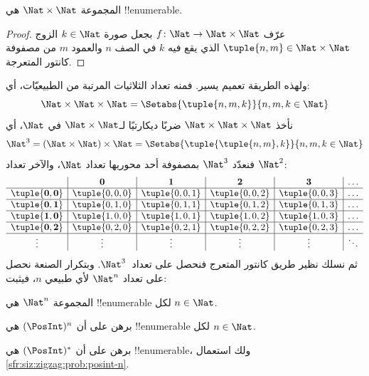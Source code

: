 \documentclass[../../../include/open-logic-section]{subfiles}
\begin{document}
\begin{prop}
المجموعة $\Nat \times \Nat$ هي !!{enumerable}.
\end{prop}

\begin{proof}
عرّف $f \colon \Nat \to \Nat\times\Nat$ بجعل صورة $k \in \Nat$
الزوج $\tuple{n,m} \in \Nat \times \Nat$ الذي يقع فيه $k$
في الصف $n$ والعمود $m$ من مصفوفة كانتور المتعرجة.
\end{proof}

\begin{explain}
ولهذه الطريقة تعميم يسير. فمنه تعداد الثلاثيات المرتبة من
الطبيعيّات، أي:
\[
\Nat \times \Nat \times \Nat = \Setabs{\tuple{n,m,k}}{n,m,k \in \Nat}
\]
نأخذ $\Nat \times \Nat \times \Nat$ ضربًا ديكارتيًا
لـ$\Nat \times \Nat$ في $\Nat$، أي
\[
\Nat^3 = (\Nat \times \Nat) \times \Nat =
\Setabs{\tuple{\tuple{n,m},k}}{n, m, k
  \in \Nat }
\]
فنعدّد $\Nat^3$ بمصفوفة أحد محوريها تعداد $\Nat$،
والآخر تعداد $\Nat^2$:
\[
\begin{array}{ c | c | c | c | c | c}
& \mathbf 0 & \mathbf 1 & \mathbf 2 & \mathbf 3 & \dots \\
\hline
\mathbf{\tuple{0,0}} & \tuple{0,0,0} & \tuple{0,0,1} & \tuple{0,0,2} & \tuple{0,0,3} & \dots \\
\hline
\mathbf{\tuple{0,1}} & \tuple{0,1,0} & \tuple{0,1,1} & \tuple{0,1,2} & \tuple{0,1,3} & \dots \\
\hline
\mathbf{\tuple{1,0}} & \tuple{1,0,0} & \tuple{1,0,1} & \tuple{1,0,2} & \tuple{1,0,3} & \dots \\
\hline
\mathbf{\tuple{0,2}} & \tuple{0,2,0} & \tuple{0,2,1} & \tuple{0,2,2} & \tuple{0,2,3} & \dots\\
\hline
\vdots & \vdots & \vdots & \vdots & \vdots & \ddots \\
\end{array}
\]
ثم نسلك نظير طريق كانتور المتعرج فنحصل على تعداد~$\Nat^3$.
وبتكرار الصنعة نحصل على تعداد $\Nat^n$ لأي طبيعي $n$، فيثبت:
\end{explain}

\begin{prop}
المجموعة $\Nat^n$ هي !!{enumerable} لكل $n \in \Nat$.
\end{prop}

\begin{prob}\label{sfr:siz:zigzag:prob:posint-n}
برهن على أن $(\PosInt)^n$ هي !!{enumerable} لكل $n \in \Nat$.
\end{prob}

\begin{prob}\label{sfr:siz:zigzag:prob:posint-star}
  برهن على أن $(\PosInt)^*$ هي !!{enumerable}، ولك استعمال \cref{sfr:siz:zigzag:prob:posint-n}.
\end{prob}
\end{document}
